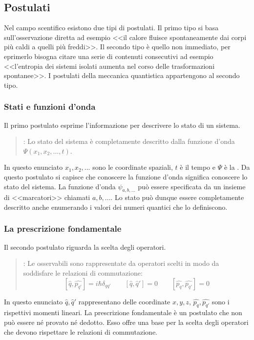 \subsection{Postulati}
Nel campo scentifico esistono due tipi di postulati. Il primo tipo si basa sull'osservazione diretta ad esempio <<il calore fluisce spontaneamente dai corpi più caldi a quelli più freddi>>. Il secondo tipo è quello non immediato, per eprimerlo bisogna citare una serie di contenuti consecutivi ad esempio <<l'entropia dei sistemi isolati aumenta nel corso delle trasformazioni spontanee>>. I postulati della meccanica quantistica appartengono al secondo tipo.

\subsubsection{Stati e funzioni d'onda}
Il primo postulato esprime l'informazione per descrivere lo stato di un sistema.
\begin{quote}
: Lo stato del sistema è completamente descritto dalla funzione d'onda $\Psi(x_1, x_2, ..., t)$.
\end{quote}
In questo enunciato $x_1, x_2, ...$ sono le coordinate spaziali, $t$ è il tempo e $\Psi$ è la . Da questo postulato si capisce che conoscere la funzione d'onda significa conoscere lo stato del sistema. La funzione d'onda $\psi_{a, b, ...}$ può essere specificata da un insieme di <<marcatori>> chiamati  $a, b, ...$. Lo stato può dunque essere completamente descritto anche enumerando i valori dei numeri quantici che lo definiscono.

\subsubsection{La prescrizione fondamentale}
Il secondo postulato riguarda la scelta degli operatori.
\begin{quote}
  : Le osservabili sono rappresentate da operatori scelti in modo da soddisfare le relazioni di commutazione:
  $$ [\hat{q}, \hat{p_{q'}}] = i \hbar \delta_{qq'} \qquad [\hat{q}, \hat{q}'] = 0 \qquad [\hat{p_q}, \hat{p_{q'}}] = 0$$
\end{quote}
In questo enunciato $\hat{q}, \hat{q}'$ rappresentano delle coordinate $x, y, z$, $\hat{p_q}, \hat{p_{q'}}$ sono i rispettivi momenti lineari. La prescrizione fondamentale è un postulato che non può essere né provato né dedotto. Esso offre una base per la scelta degli operatori che devono rispettare le relazioni di commutazione.

